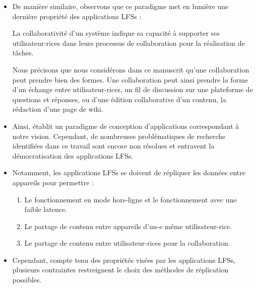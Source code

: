 \begin{itemize}
\begin{enumerate}
        \item La longétivité de l'application correspond aux propriétés de pérennité (\autoref{def:perennite}) et de résistance à la censure (\autoref{def:censorship}).
      \end{enumerate}
      Notons qu'il découle de ces propriétés que les applications \acp{LFS} sont fondamentalement \ac{P2P}.
    \item De manière similaire, observons que ce paradigme met en lumière une dernière propriété des applications \acp{LFS} :
      \begin{definition}[Collaborativité]
        \label{def:collaborative}
        La collaborativité d'un système indique sa capacité à supporter ses utilisateur-rices dans leurs processus de collaboration pour la réalisation de tâches.
      \end{definition}
      Nous précisons que nous considérons dans ce manuscrit qu'une collaboration peut prendre bien des formes.
      Une collaboration peut ainsi prendre la forme d'un échange entre utilisateur-rices, \eg un fil de discussion sur une plateforme de questions et réponses, ou d'une édition collaborative d'un contenu, \eg la rédaction d'une page de wiki.
    \item Ainsi, \cite{localfirstsoftware2019} établit un paradigme de conception d'applications correspondant à notre vision.
      Cependant, de nombreuses problématiques de recherche identifiées dans ce travail sont encore non résolues et entravent la démocratisation des applications \acp{LFS}.
    \item Notamment, les applications \acp{LFS} se doivent de répliquer les données entre appareils pour permettre :
      \begin{enumerate}
        \item Le fonctionnement en mode hors-ligne et le fonctionnement avec une faible latence.
        \item Le partage de contenu entre appareils d'un-e même utilisateur-rice.
        \item Le partage de contenu entre utilisateur-rices pour la collaboration.
      \end{enumerate}
    \item Cependant, compte tenu des propriétés visées par les applications \acp{LFS}, plusieurs contraintes restreignent le choix des méthodes de réplication possibles.

\end{itemize}
